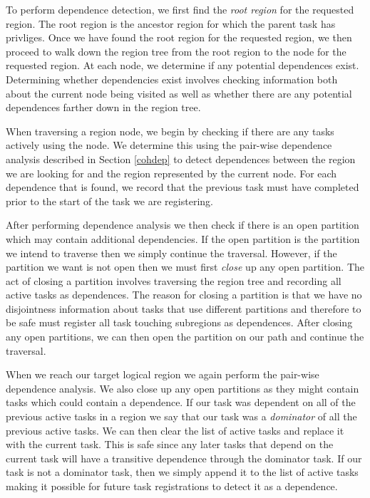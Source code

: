 To perform dependence detection, we first find the {\em root region} for the 
requested region.  The root region is the ancestor region for which the parent task
has privliges.  Once we have found the root region for the requested region, we then proceed to walk
down the region tree from the root region to the node
for the requested region.  At each node, we determine if any potential dependences exist.
Determining whether dependencies exist involves checking information both about the current
node being visited as well as whether there are any potential dependences farther down
in the region tree.  

When traversing a region node, we begin by checking if there are any tasks actively using
the node.  We determine this using the pair-wise dependence analysis described 
in Section \ref{cohdep} to detect dependences between the region we are looking for and the
region represented by the current node.  For each dependence that is found, we record that the previous
task must have completed prior to the start of the task we are registering.  

After performing
dependence analysis we then check if there is an open partition which may contain additional
dependencies.  If the open partition is the partition we intend to traverse then we
simply continue the traversal.  However, if the partition we want is not open then we must
first {\em close} up any open partition.   The act of closing a partition 
involves traversing the region tree and recording
all active tasks as dependences.  The reason for closing a partition is that we have no disjointness
information about tasks that use different partitions and therefore to be safe must register
all task touching subregions as dependences.  After closing any open partitions, we
can then open the partition on our path and continue the traversal. 

When we reach our target logical region we again perform the pair-wise dependence analysis.
We also close up any open partitions as they might contain tasks which could contain
a dependence.  If our task was dependent on all of the previous active tasks in a region
we say that our task was a {\em dominator} of all the previous active tasks.  We can
then clear the list of active tasks and replace it with the current task.  This is safe since
any later tasks that depend on the current task will have a transitive dependence 
through the dominator task.  If our task is not a dominator task, then we simply append
it to the list of active tasks making it possible for future task registrations to detect
it as a dependence.

